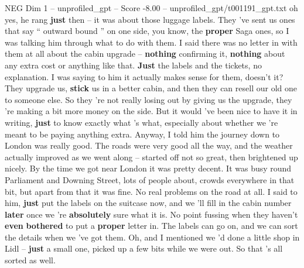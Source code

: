\begin{textsample}{NEG Dim 1 – unprofiled\_gpt – Score -8.00 – unprofiled\_gpt/t001191\_gpt.txt}  \label{ex:f1_neg_030}
oh yes, he rang \textbf{just} then – it was about those luggage labels.
They ’ve sent us ones that say “ outward bound ” on one side, you know, the \textbf{proper} Saga ones, so I was talking him through what to do with them.
I said there was no letter in with them at all about the cabin upgrade – \textbf{nothing} confirming it, \textbf{nothing} about any extra cost or anything like that. \textbf{Just} the labels and the tickets, no explanation.
I was saying to him it actually makes sense for them, doesn't it?
They upgrade us, \textbf{stick} us in a better cabin, and then they can resell our old one to someone else.
So they ’re not really losing out by giving us the upgrade, they ’re making a bit more money on the side.
But it would ’ve been nice to have it in writing, \textbf{just} to know exactly what ’s what, especially about whether we ’re meant to be paying anything extra.
Anyway, I told him the journey down to London was really good.
The roads were very good all the way, and the weather actually improved as we went along – started off not so great, then brightened up nicely.
By the time we got near London it was pretty decent.
It was busy round Parliament and Downing Street, lots of people about, crowds everywhere in that bit, but apart from that it was fine.
No real problems on the road at all.
I said to him, \textbf{just} put the labels on the suitcase now, and we ’ll fill in the cabin number \textbf{later} once we ’re \textbf{absolutely} sure what it is.
No point fussing when they haven't \textbf{even} \textbf{bothered} to put a \textbf{proper} letter in.
The labels can go on, and we can sort the details when we ’ve got them.
Oh, and I mentioned we ’d done a little shop in Lidl – \textbf{just} a small one, picked up a few bits while we were out.
So that ’s all sorted as well.

\end{textsample}
